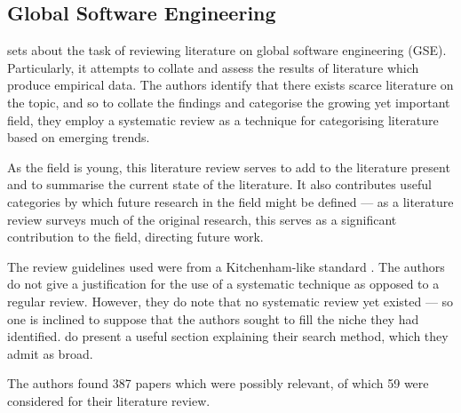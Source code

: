 \subsection{Global Software Engineering}
\citet*{Smite2010} sets about the task of reviewing literature on global software engineering (GSE). Particularly, it attempts to collate and assess the results of literature which produce empirical data. The authors identify that there exists scarce literature on the topic, and so to collate the findings and categorise the growing yet important field, they employ a systematic review as a technique for categorising literature based on emerging trends.\par

As the field is young, this literature review serves to add to the literature present and to summarise the current state of the literature. It also contributes useful categories by which future research in the field might be defined --- as a literature review surveys much of the original research, this serves as a significant contribution to the field, directing future work.\par

The review guidelines used were from a Kitchenham-like standard \citep{Kitchenham2007}. The authors do not give a justification for the use of a systematic technique as opposed to a regular review. However, they do note that no systematic review yet existed --- so one is inclined to suppose that the authors sought to fill the niche they had identified. \citeauthor{Smite2010} do present a useful section explaining their search method, which they admit as broad.\par 

The authors found 387 papers which were possibly relevant, of which 59 were considered for their literature review.\par

